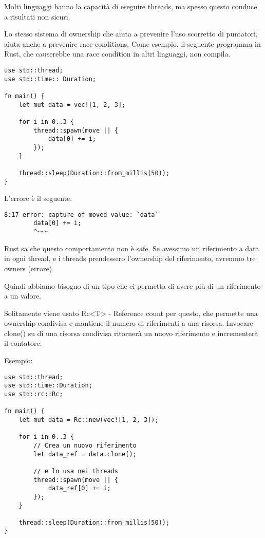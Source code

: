 Molti linguaggi hanno la capacità di eseguire threads, ma spesso questo conduce
a risultati non sicuri.

Lo stesso sistema di ownership che aiuta a prevenire l’uso scorretto di
puntatori, aiuta anche a prevenire race conditions.
Come esempio, il seguente programma in Rust, che causerebbe una race condition
in altri linguaggi, non compila.

\begin{lstlisting}
use std::thread;
use std::time:: Duration;

fn main() {
    let mut data = vec![1, 2, 3];

    for i in 0..3 {
        thread::spawn(move || {
            data[0] += i;
        });
    }

    thread::sleep(Duration::from_millis(50));
}
\end{lstlisting}

L’errore è il seguente:


\begin{lstlisting}
8:17 error: capture of moved value: `data`
        data[0] += i;
        ^~~~
\end{lstlisting}

Rust sa che questo comportamento non è safe. Se avessimo un riferimento a data
in ogni thread, e i threads prendessero l’ownership del riferimento, avremmo
tre owners (errore).

Quindi abbiamo bisogno di un tipo che ci permetta di avere più di un riferimento
a un valore.

Solitamente viene usato Rc<T> - Reference count per questo, che permette una
ownership condivisa e mantiene il numero di riferimenti a una risorsa.
Invocare clone() su di una risorsa condivisa ritornerà un nuovo riferimento e
incrementerà il contatore.

Esempio:

\begin{lstlisting}
use std::thread;
use std::time::Duration;
use std::rc::Rc;

fn main() {
    let mut data = Rc::new(vec![1, 2, 3]);

    for i in 0..3 {
        // Crea un nuovo riferimento
        let data_ref = data.clone();

        // e lo usa nei threads
        thread::spawn(move || {
            data_ref[0] += i;
        });
    }

    thread::sleep(Duration::from_millis(50));
}
\end{lstlisting}

